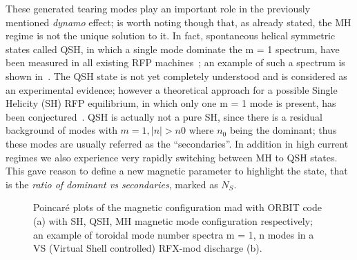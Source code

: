 These generated tearing modes play an important role in the previously mentioned \textit{dynamo} effect; is worth noting though that, as already stated, the MH regime is not the unique solution to it. 
In fact, spontaneous helical symmetric states called \acl{QSH}, in which a single mode dominate the m = 1 spectrum, have been measured in all existing RFP machines~\cite{Martin_1999}; an example of such a spectrum is shown in~\Figure{\ref{img:MHQSH_b}}. The QSH state is not yet completely understood and is considered as an experimental evidence; however a theoretical approach for a possible Single Helicity (SH) RFP equilibrium, in which only one m = 1 mode is present, has been conjectured~\cite{Cappello_1996}. QSH is actually not a pure SH, since there is a residual background of modes with $m = 1, |n| > n0$ where $n_0$ being the dominant; thus these modes are usually referred as the “secondaries”. In addition in high current regimes we also experience very rapidly switching between MH to QSH states. This gave reason to define a new magnetic parameter to highlight the state, that is the \textit{ratio of dominant vs secondaries}, marked as $N_S$.
\begin{figure}
    \centering
    \caption{Poincaré plots of the magnetic configuration mad with ORBIT code (a) with SH, QSH, MH magnetic mode configuration     respectively; an example of toroidal mode number spectra m = 1, n modes in a VS (Virtual Shell controlled) RFX-mod discharge (b). }
    \label{img:MHQSH}
\end{figure}















